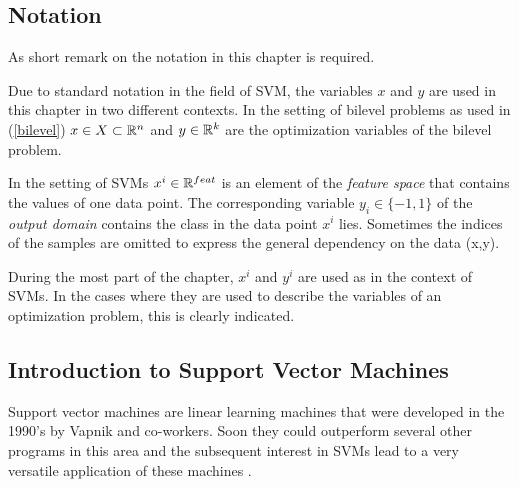 

\subsection{Notation}

As short remark on the notation in this chapter is required.

Due to standard notation in the field of SVM, the variables \(x\) and \(y\) are used in this chapter in two different contexts.
In the setting of bilevel problems as used in (\ref{bilevel}) \(x \in X \subset \mathbb{R}^n\) and \(y \in \mathbb{R}^k\) are the optimization variables of the bilevel problem.

In the setting of SVMs \(x^i \in \mathbb{R}^{feat}\) is an element of the \emph{feature space} that contains the values of one data point. The corresponding variable \(y_i \in \{-1,1\}\) of the \emph{output domain} contains the class in the data point \(x^i\) lies. Sometimes the indices of the samples are omitted to express the general dependency on the data (x,y).

During the most part of the chapter, \(x^i\) and \(y^i\) are used as in the context of SVMs. In the cases where they are used to describe the variables of an optimization problem, this is clearly indicated.

%

\subsection{Introduction to Support Vector Machines}
Support vector machines are linear learning machines that were developed in the 1990's by Vapnik and co-workers. Soon they could outperform several other programs in this area \cite{Cristianini2000} and the subsequent interest in SVMs lead to a very versatile application of these machines \cite{Kunapuli2008}.


